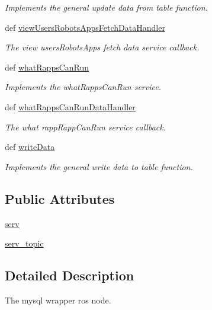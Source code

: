 \begin{DoxyCompactItemize}
\begin{DoxyCompactList}\small\item\em Implements the general update data from table function. \end{DoxyCompactList}\item 
def \hyperlink{classmysql__wrapper_1_1MySQLdbWrapper_a65fa0c4e4597902487ad3f626581ebd2}{view\-Users\-Robots\-Apps\-Fetch\-Data\-Handler}
\begin{DoxyCompactList}\small\item\em The view users\-Robots\-Apps fetch data service callback. \end{DoxyCompactList}\item 
def \hyperlink{classmysql__wrapper_1_1MySQLdbWrapper_a8a7d07bf8a95042044059cb0603d2477}{what\-Rapps\-Can\-Run}
\begin{DoxyCompactList}\small\item\em Implements the what\-Rapps\-Can\-Run service. \end{DoxyCompactList}\item 
def \hyperlink{classmysql__wrapper_1_1MySQLdbWrapper_a4a6c78b2a40d526e523906759c774693}{what\-Rapps\-Can\-Run\-Data\-Handler}
\begin{DoxyCompactList}\small\item\em The what rapp\-Rapp\-Can\-Run service callback. \end{DoxyCompactList}\item 
def \hyperlink{classmysql__wrapper_1_1MySQLdbWrapper_a48109db3d2530bef03dc17087a91c8a5}{write\-Data}
\begin{DoxyCompactList}\small\item\em Implements the general write data to table function. \end{DoxyCompactList}\end{DoxyCompactItemize}
\subsection*{Public Attributes}
\begin{DoxyCompactItemize}
\item 
\hyperlink{classmysql__wrapper_1_1MySQLdbWrapper_ad3f471033029f6ca7487fa7e32ba533b}{serv}
\item 
\hyperlink{classmysql__wrapper_1_1MySQLdbWrapper_a63992807961399f3fbd3f963daad8cc1}{serv\-\_\-topic}
\end{DoxyCompactItemize}


\subsection{Detailed Description}
The mysql wrapper ros node. 

